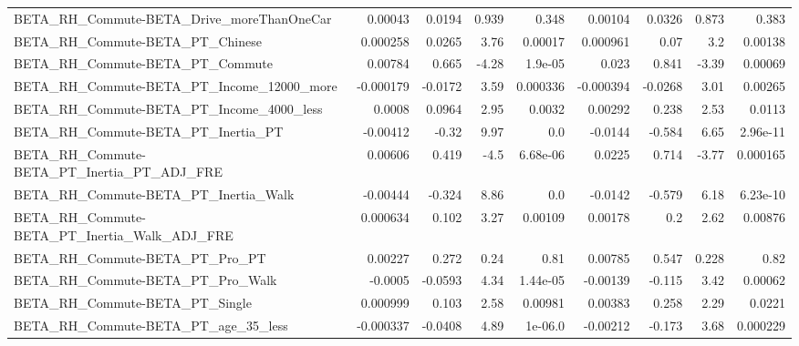 \begin{tabular}{lrrrrrrrr}
BETA\_RH\_Commute-BETA\_Drive\_moreThanOneCar          &     0.00043 &       0.0194 &    0.939 &    0.348 &    0.00104 &      0.0326 &        0.873 &         0.383 \\
BETA\_RH\_Commute-BETA\_PT\_Chinese                    &    0.000258 &       0.0265 &     3.76 &  0.00017 &   0.000961 &        0.07 &          3.2 &       0.00138 \\
BETA\_RH\_Commute-BETA\_PT\_Commute                    &     0.00784 &        0.665 &    -4.28 &  1.9e-05 &      0.023 &       0.841 &        -3.39 &       0.00069 \\
BETA\_RH\_Commute-BETA\_PT\_Income\_12000\_more          &   -0.000179 &      -0.0172 &     3.59 & 0.000336 &  -0.000394 &     -0.0268 &         3.01 &       0.00265 \\
BETA\_RH\_Commute-BETA\_PT\_Income\_4000\_less           &      0.0008 &       0.0964 &     2.95 &   0.0032 &    0.00292 &       0.238 &         2.53 &        0.0113 \\
BETA\_RH\_Commute-BETA\_PT\_Inertia\_PT                 &    -0.00412 &        -0.32 &     9.97 &      0.0 &    -0.0144 &      -0.584 &         6.65 &      2.96e-11 \\
BETA\_RH\_Commute-BETA\_PT\_Inertia\_PT\_ADJ\_FRE         &     0.00606 &        0.419 &     -4.5 & 6.68e-06 &     0.0225 &       0.714 &        -3.77 &      0.000165 \\
BETA\_RH\_Commute-BETA\_PT\_Inertia\_Walk               &    -0.00444 &       -0.324 &     8.86 &      0.0 &    -0.0142 &      -0.579 &         6.18 &      6.23e-10 \\
BETA\_RH\_Commute-BETA\_PT\_Inertia\_Walk\_ADJ\_FRE       &    0.000634 &        0.102 &     3.27 &  0.00109 &    0.00178 &         0.2 &         2.62 &       0.00876 \\
BETA\_RH\_Commute-BETA\_PT\_Pro\_PT                     &     0.00227 &        0.272 &     0.24 &     0.81 &    0.00785 &       0.547 &        0.228 &          0.82 \\
BETA\_RH\_Commute-BETA\_PT\_Pro\_Walk                   &     -0.0005 &      -0.0593 &     4.34 & 1.44e-05 &   -0.00139 &      -0.115 &         3.42 &       0.00062 \\
BETA\_RH\_Commute-BETA\_PT\_Single                     &    0.000999 &        0.103 &     2.58 &  0.00981 &    0.00383 &       0.258 &         2.29 &        0.0221 \\
BETA\_RH\_Commute-BETA\_PT\_age\_35\_less                &   -0.000337 &      -0.0408 &     4.89 &  1e-06.0 &   -0.00212 &      -0.173 &         3.68 &      0.000229 \\

\end{tabular}
